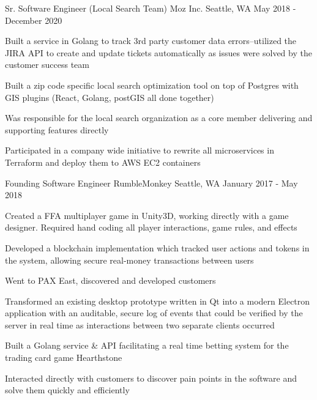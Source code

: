 \begin{cventries}
  \cventry
    {Sr. Software Engineer (Local Search Team)} %
    {Moz Inc.} %
    {Seattle, WA} %
    {May 2018 - December 2020} %
    {
      \begin{cvitems} %
        \item {Built a service in Golang to track 3rd party customer data errors--utilized the JIRA API to create and update tickets automatically as issues were solved by the customer success team}
        \item {Built a zip code specific local search optimization tool on top of Postgres with GIS plugins (React, Golang, postGIS all done together)}
        \item {Was responsible for the local search organization as a core member delivering and supporting features directly}
        \item {Participated in a company wide initiative to rewrite all microservices in Terraform and deploy them to AWS EC2 containers}
      \end{cvitems}
    }

  \cventry
    {Founding Software Engineer} %
    {RumbleMonkey} %
    {Seattle, WA} %
    {January 2017 - May 2018} %
    {
      \begin{cvitems} %
        \item {Created a FFA multiplayer game in Unity3D, working directly with a game designer. Required hand coding all player interactions, game rules, and effects}
        \item {Developed a blockchain implementation which tracked user actions and tokens in the system, allowing secure real-money transactions between users}
        \item {Went to PAX East, discovered and developed customers}
        \item {Transformed an existing desktop prototype written in Qt into a modern Electron application with an auditable, secure log of events that could be verified by the server in real time as interactions between two separate clients occurred}
        \item {Built a Golang service \& API facilitating a real time betting system for the trading card game Hearthstone}
        \item {Interacted directly with customers to discover pain points in the software and solve them quickly and efficiently}
      \end{cvitems}
    }


\end{cventries}
